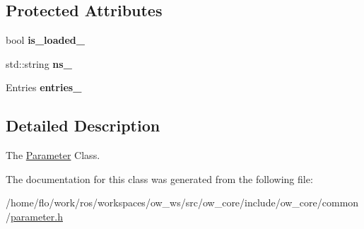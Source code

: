 \subsection*{Protected Attributes}
\begin{DoxyCompactItemize}
\item 
bool {\bfseries is\+\_\+loaded\+\_\+}\hypertarget{classow_1_1Parameter_adb729fea52df3dde46380fe3fc2b0c00}{}\label{classow_1_1Parameter_adb729fea52df3dde46380fe3fc2b0c00}

\item 
std\+::string {\bfseries ns\+\_\+}\hypertarget{classow_1_1Parameter_ac021a1eb8fa669265f41e11f39d8f7e0}{}\label{classow_1_1Parameter_ac021a1eb8fa669265f41e11f39d8f7e0}

\item 
Entries {\bfseries entries\+\_\+}\hypertarget{classow_1_1Parameter_ad7980658fd319e81b2a380586dd1a6b2}{}\label{classow_1_1Parameter_ad7980658fd319e81b2a380586dd1a6b2}

\end{DoxyCompactItemize}


\subsection{Detailed Description}
The \hyperlink{classow_1_1Parameter}{Parameter} Class. 

The documentation for this class was generated from the following file\+:\begin{DoxyCompactItemize}
\item 
/home/flo/work/ros/workspaces/ow\+\_\+ws/src/ow\+\_\+core/include/ow\+\_\+core/common/\hyperlink{parameter_8h}{parameter.\+h}\end{DoxyCompactItemize}
